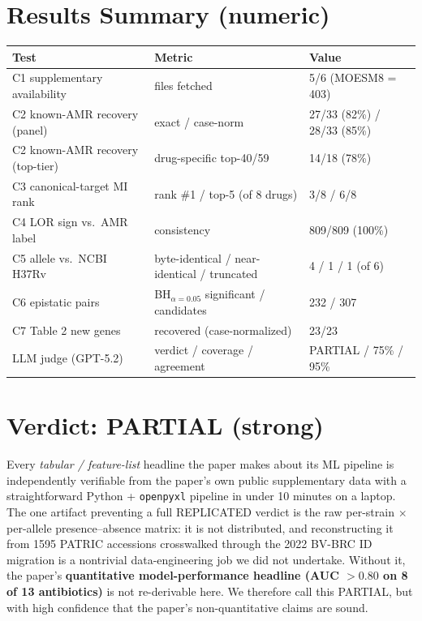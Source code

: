 \documentclass[11pt]{article}
\begin{document}
\section{Results Summary (numeric)}
\begin{longtable}{@{}lll@{}}
\toprule
Test & Metric & Value \\
\midrule
C1 supplementary availability & files fetched & 5/6 (MOESM8 = 403) \\
C2 known-AMR recovery (panel)   & exact / case-norm & 27/33 (82\%) / 28/33 (85\%) \\
C2 known-AMR recovery (top-tier)& drug-specific top-40/59 & 14/18 (78\%) \\
C3 canonical-target MI rank    & rank \#1 / top-5 (of 8 drugs) & 3/8 / 6/8 \\
C4 LOR sign vs.\ AMR label     & consistency & 809/809 (100\%) \\
C5 allele vs.\ NCBI H37Rv     & byte-identical / near-identical / truncated & 4 / 1 / 1 (of 6) \\
C6 epistatic pairs             & BH$_{\alpha=0.05}$ significant / candidates & 232 / 307 \\
C7 Table 2 new genes           & recovered (case-normalized) & 23/23 \\
LLM judge (GPT-5.2)            & verdict / coverage / agreement & PARTIAL / 75\% / 95\% \\
\bottomrule
\end{longtable}

\section{Verdict: PARTIAL (strong)}
Every \emph{tabular / feature-list} headline the paper makes about its ML pipeline is
independently verifiable from the paper's own public supplementary data with a straightforward
Python + \texttt{openpyxl} pipeline in under 10 minutes on a laptop. The one artifact
preventing a full REPLICATED verdict is the raw per-strain $\times$ per-allele presence--absence
matrix: it is not distributed, and reconstructing it from 1595 PATRIC accessions crosswalked
through the 2022 BV-BRC ID migration is a nontrivial data-engineering job we did not undertake.
Without it, the paper's \textbf{quantitative model-performance headline (AUC $>0.80$ on 8 of
13 antibiotics)} is not re-derivable here. We therefore call this PARTIAL, but with high
confidence that the paper's non-quantitative claims are sound.
\end{document}
